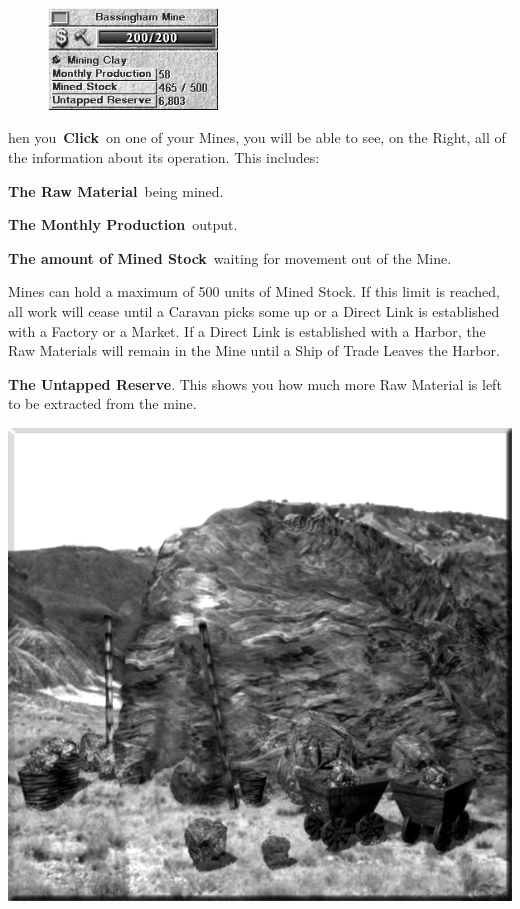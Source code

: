 
\begin{figure}
	\vspace{-20pt}
	\begin{center}
		\includegraphics[width=0.4\textwidth]{Imineinfo}
	\end{center}
	\vspace{-50pt}
\end{figure}

hen you \textbf{Click} on one of your Mines, you will be able to see, on the Right, all of the information about its operation. This includes:

\textbf{The Raw Material} being mined.

\textbf{The Monthly Production} output.

\textbf{The amount of Mined Stock} waiting for movement out of the Mine.

Mines can hold a maximum of 500 units of Mined Stock. If this limit is reached, all work will cease until a Caravan picks some up or a Direct Link is established with a Factory or a Market. If a Direct Link is established with a Harbor, the Raw Materials will remain in the Mine until a Ship of Trade Leaves the Harbor.

\textbf{The Untapped Reserve}. This shows you how much more Raw Material is left to be extracted from the mine.

\begin{center}
	\includegraphics[width=0.9\linewidth]{Amine}
\end{center}

